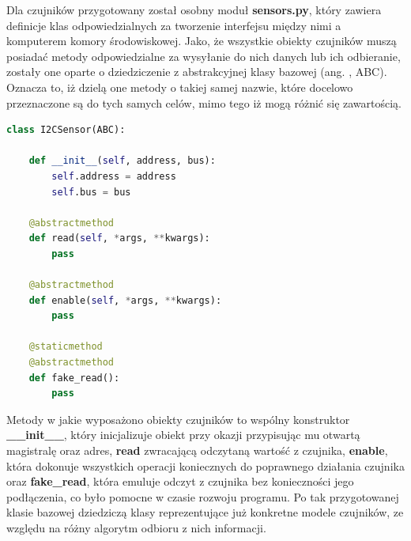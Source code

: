 Dla czujników przygotowany został osobny moduł \textbf{sensors.py}, który zawiera definicje klas odpowiedzialnych za tworzenie interfejsu między nimi a komputerem komory środowiskowej. Jako, że wszystkie obiekty czujników muszą posiadać metody odpowiedzialne za wysyłanie do nich danych lub ich odbieranie, zostały one oparte o dziedziczenie z abstrakcyjnej klasy bazowej (ang. , ABC). Oznacza to, iż dzielą one metody o takiej samej nazwie, które docelowo przeznaczone są do tych samych celów, mimo tego iż mogą różnić się zawartością.
\begin{lstlisting}[language=Python, caption={Abstrakcyjna klasa bazowa czujników.}]
class I2CSensor(ABC):

	def __init__(self, address, bus):
		self.address = address
		self.bus = bus
	
	@abstractmethod
	def read(self, *args, **kwargs):
		pass
	
	@abstractmethod
	def enable(self, *args, **kwargs):
		pass
	
	@staticmethod
	@abstractmethod
	def fake_read():
		pass	
\end{lstlisting}
Metody w jakie wyposażono obiekty czujników to wspólny konstruktor \textbf{\_\_init\_\_}, który inicjalizuje obiekt przy okazji przypisując mu otwartą magistralę oraz adres, \textbf{read} zwracającą odczytaną wartość z czujnika, \textbf{enable}, która dokonuje wszystkich operacji koniecznych do poprawnego działania czujnika oraz \textbf{fake\_read}, która emuluje odczyt z czujnika bez konieczności jego podłączenia, co było pomocne w czasie rozwoju programu. Po tak przygotowanej klasie bazowej dziedziczą klasy reprezentujące już konkretne modele czujników, ze względu na różny algorytm odbioru z nich informacji.
